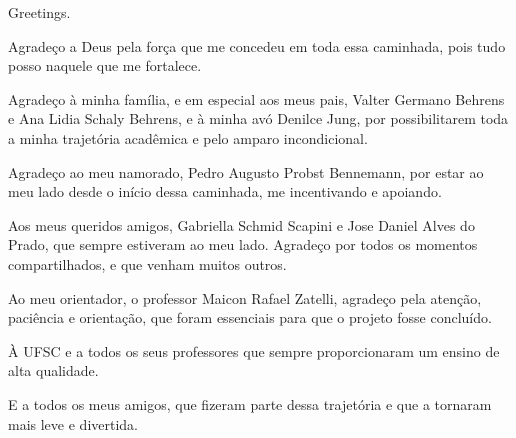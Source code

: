 


\begin{agradecimentos}

\lang
{
    Greetings.
}
{
    Agradeço a Deus pela força que me concedeu em toda essa caminhada, pois tudo posso naquele que me fortalece.

    Agradeço à minha família, e em especial aos meus pais, Valter Germano Behrens e Ana Lidia Schaly Behrens, e à minha avó Denilce Jung, por possibilitarem toda a minha trajetória acadêmica e pelo amparo incondicional.

    Agradeço ao meu namorado, Pedro Augusto Probst Bennemann, por estar ao meu lado desde o início dessa caminhada, me incentivando e apoiando.

    Aos meus queridos amigos, Gabriella Schmid Scapini e Jose Daniel Alves do Prado, que sempre estiveram ao meu lado. Agradeço por todos os momentos compartilhados, e que venham muitos outros.

    Ao meu orientador, o professor Maicon Rafael Zatelli, agradeço pela atenção, paciência e orientação, que foram essenciais para que o projeto fosse concluído.

    À UFSC e a todos os seus professores que sempre proporcionaram um ensino de alta qualidade.

    E a todos os meus amigos, que fizeram parte dessa trajetória e que a tornaram mais leve e divertida.

}

\end{agradecimentos}


%
%
%
